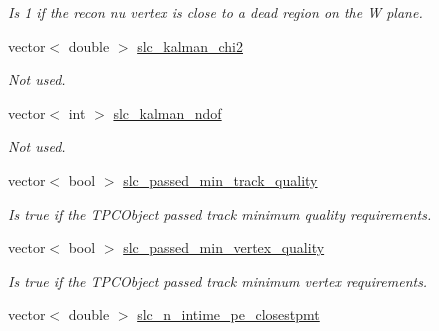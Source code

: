 \begin{DoxyCompactItemize}
\begin{DoxyCompactList}\small\item\em Is 1 if the recon nu vertex is close to a dead region on the W plane. \end{DoxyCompactList}\item 
\hypertarget{classUBXSecEvent_a7b3a38020a5ff375b9a9632c6eda9845}{vector$<$ double $>$ \hyperlink{classUBXSecEvent_a7b3a38020a5ff375b9a9632c6eda9845}{slc\-\_\-kalman\-\_\-chi2}}\label{classUBXSecEvent_a7b3a38020a5ff375b9a9632c6eda9845}

\begin{DoxyCompactList}\small\item\em Not used. \end{DoxyCompactList}\item 
\hypertarget{classUBXSecEvent_ac4a8b79e4a4b02254ede89b475f3ca5c}{vector$<$ int $>$ \hyperlink{classUBXSecEvent_ac4a8b79e4a4b02254ede89b475f3ca5c}{slc\-\_\-kalman\-\_\-ndof}}\label{classUBXSecEvent_ac4a8b79e4a4b02254ede89b475f3ca5c}

\begin{DoxyCompactList}\small\item\em Not used. \end{DoxyCompactList}\item 
\hypertarget{classUBXSecEvent_aab3be8887f062f848104113097b27ad5}{vector$<$ bool $>$ \hyperlink{classUBXSecEvent_aab3be8887f062f848104113097b27ad5}{slc\-\_\-passed\-\_\-min\-\_\-track\-\_\-quality}}\label{classUBXSecEvent_aab3be8887f062f848104113097b27ad5}

\begin{DoxyCompactList}\small\item\em Is true if the T\-P\-C\-Object passed track minimum quality requirements. \end{DoxyCompactList}\item 
\hypertarget{classUBXSecEvent_af2bdc55d1c56cea1c4e3104e262f029c}{vector$<$ bool $>$ \hyperlink{classUBXSecEvent_af2bdc55d1c56cea1c4e3104e262f029c}{slc\-\_\-passed\-\_\-min\-\_\-vertex\-\_\-quality}}\label{classUBXSecEvent_af2bdc55d1c56cea1c4e3104e262f029c}

\begin{DoxyCompactList}\small\item\em Is true if the T\-P\-C\-Object passed track minimum vertex requirements. \end{DoxyCompactList}\item 
\hypertarget{classUBXSecEvent_a8234ab4e219c1355370b5f141ad10211}{vector$<$ double $>$ \hyperlink{classUBXSecEvent_a8234ab4e219c1355370b5f141ad10211}{slc\-\_\-n\-\_\-intime\-\_\-pe\-\_\-closestpmt}}\label{classUBXSecEvent_a8234ab4e219c1355370b5f141ad10211}


\end{DoxyCompactItemize}
